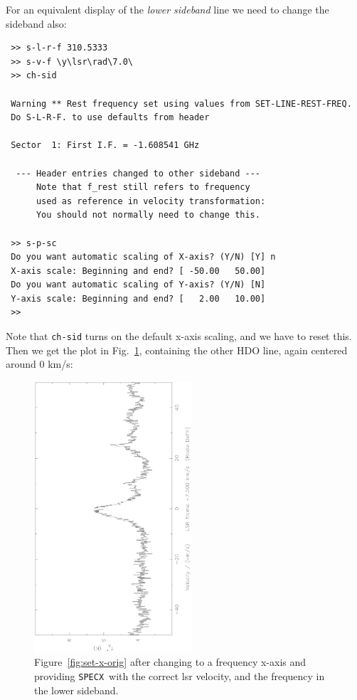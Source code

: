 \documentclass[11pt,twoside]{article}
\newcommand{\SPECX}{{\tt SPECX}}
\begin{document}
For an equivalent display of the {\it lower sideband} line we need to
change the sideband also:
\begin{verbatim}
 >> s-l-r-f 310.5333
 >> s-v-f \y\lsr\rad\7.0\
 >> ch-sid

 Warning ** Rest frequency set using values from SET-LINE-REST-FREQ.
 Do S-L-R-F. to use defaults from header

 Sector  1: First I.F. = -1.608541 GHz

  --- Header entries changed to other sideband ---
      Note that f_rest still refers to frequency
      used as reference in velocity transformation:
      You should not normally need to change this.

 >> s-p-sc
 Do you want automatic scaling of X-axis? (Y/N) [Y] n
 X-axis scale: Beginning and end? [ -50.00   50.00]
 Do you want automatic scaling of Y-axis? (Y/N) [N]
 Y-axis scale: Beginning and end? [   2.00   10.00]
 >>
\end{verbatim}


Note that {\tt ch-sid} turns on the default x-axis scaling, and we
have to reset this.  Then we get the plot in Fig.~\ref{fig:set-to-lsb},
containing the other HDO line, again centered around 0 km/s:

\begin{figure}[ht]
\begin{minipage}[t]{\textwidth}
\begin{minipage}[b]{0.5\textwidth}
\centering
\includegraphics[angle=-90,width=2.3in]{sc8_hdo-lsb.ps}
\end{minipage}
\begin{minipage}[b]{0.45\textwidth}
\caption[Part of the same in the LSB ]
{\small{Figure~\ref{fig:set-x-orig} after changing to a frequency
x-axis and providing \SPECX\ with the correct lsr velocity, and the
frequency in the lower sideband.
\vspace*{1cm}
}}
\label{fig:set-to-lsb}
\end{minipage}
\end{minipage}
\end{figure}
\end{document}
